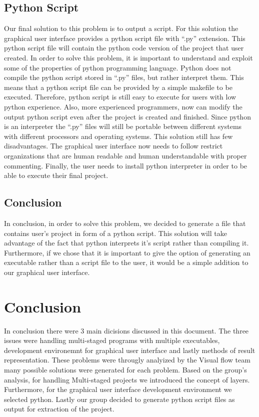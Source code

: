 \documentclass[journal,10pt,onecolumn,compsoc]{IEEEtran} \usepackage[margin=1.0in]{geometry} \usepackage{pdfpages} \usepackage{graphicx}
\begin{document}
\subsection{Python Script}
Our final solution to this problem is to output a script. 
For this solution the graphical user interface provides a python script file with “.py” extension. 
This python script file will contain the python code version of the project that user created. 
In order to solve this problem, it is important to understand and exploit some of the properties of python programming language. 
Python does not compile the python script stored in “.py” files, but rather interpret them. 
This means that a python script file can be provided by a simple makefile to be executed. 
Therefore, python script is still easy to execute for users with low python experience. 
Also, more experienced programmers, now can modify the output python script even after the project is created and finished. 
Since python is an interpreter the “.py” files will still be portable between different systems with different processors and operating systems. 
This solution still has few disadvantages. 
The graphical user interface now needs to follow restrict organizations that are human readable and human understandable with proper commenting. 
Finally, the user needs to install python interpreter in order to be able to execute their final project.

\subsection{Conclusion}
In conclusion, in order to solve this problem, we decided to generate a file that contains user’s project in form of a python script. 
This solution will take advantage of the fact that python interprets it’s script rather than compiling it. Furthermore, if we chose that it is important to give the option of generating an executable rather than a script file to the user, it would be a simple addition to our graphical user interface.

\newpage

\section{Conclusion}
In conclusion there were 3 main dicisions discussed in this document. The three issues were handling multi-staged programs with multiple executables,
development environemnt for graphical user interface and lastly methods of result representation.
These problems were througly analyized by the Visual flow team many possible solutions were generated for each problem.
Based on the group's analysis, for handling Multi-staged projects we introduced the concept of layers.
Furthermore, for the graphical user interface development environment we selected python.
Lastly our group decided to generate python script files as output for extraction of the project.
\newpage



\end{document}
